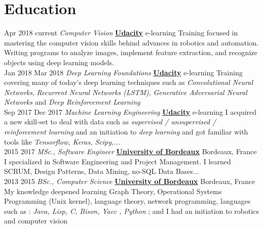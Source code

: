 \documentclass[letterpaper]{twentysecondcv} %
\begin{document}
\section{Education}

\begin{twenty} %

  \twentyitem
      {Apr 2018}
      {current}
        { \textit{Computer Vision}}
        {\href{http://www.udacity.com/}{\textbf{Udacity}}}
        {e-learning}
        {Training focused in mastering the computer vision skills behind advances in robotics
          and automation. Writing programs to analyze images, implement feature
          extraction,
          and recognize objects using deep learning models.}
    \\
  \twentyitem
      {Jan 2018}
      {Mar 2018}
        { \textit{Deep Learning Foundations}}
        {\href{http://www.udacity.com/}{\textbf{Udacity}}}
        {e-learning}
        {Training covering many of today's deep learning techniques such as
          \textit{Convolutional Neural Networks}, \textit{Recurrent Neural Networks (LSTM)},
          \textit{Generative Adversarial Neural Networks} and \textit{Deep Reinforcement Learning}}
    \\
  \twentyitem
      {Sep 2017}
      {Dec 2017}
        { \textit{Machine Learning Engineering}}
        {\href{http://www.udacity.com/}{\textbf{Udacity}}}
        {e-learning}
        {I acquired a new skill-set to deal with data such as \textit{supervised /
            unsupervised / reinforcement learning} and an initiation to \textit{deep learning}
          and got familiar with tools like \textit{Tensorflow, Keras, Scipy,...}}
    \\
  \twentyitem
      {2015}
      {2017}
        { \textit{MSc., Software Engineer}}
        {\href{http://www.u-bordeaux.com/}{\textbf{University of Bordeaux}}}
        {Bordeaux, France}
        {I specialized in Software Engineering and Project Management. I learned SCRUM, Design Patterns, Data Mining, no-SQL
Data Bases...}
    \\
  \twentyitem
  {2013}
  {2015}
        { \textit{BSc., Computer Science}}
        {\href{http://www.u-bordeaux.com/}{\textbf{University of Bordeaux}}}
        {Bordeaux, France}
        {My knowledge deepened learning Graph Theory, Operational Systems
          Programming (Unix kernel), language theory, network programming,
          languages such as : \textit{Java, Lisp, C, Bison, Yacc , Python }; and I had an
          initiation to robotics and computer vision}
    \\

\end{twenty}
\end{document}

